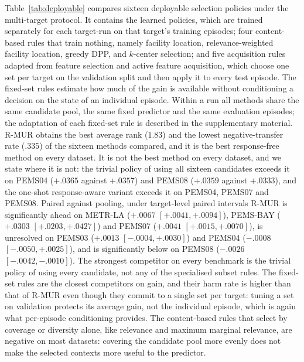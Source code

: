 Table~\ref{tab:deployable} compares sixteen deployable selection policies
under the multi-target protocol. It contains the learned policies, which are
trained separately for each target-run on that target's training episodes;
four content-based rules that train nothing, namely facility location,
relevance-weighted facility location, greedy DPP, and $k$-center selection; and
five acquisition rules adapted from feature selection and active feature
acquisition, which choose one set per target on the validation split and then
apply it to every test episode. The fixed-set rules estimate how much of the
gain is available without conditioning a decision on the state of an individual
episode. Within a run all methods share the same candidate pool, the same fixed
predictor and the same evaluation episodes; the adaptation of each fixed-set
rule is described in the supplementary material. R-MUR obtains the best average
rank ($1.83$) and the lowest negative-transfer rate ($.335$) of the sixteen
methods compared, and it is the best response-free method on every dataset. It
is not the best method on every dataset, and we state where it is not: the
trivial policy of using all sixteen candidates exceeds it on PEMS04 ($+.0365$
against $+.0357$) and PEMS08 ($+.0359$ against $+.0333$), and the one-shot
response-aware variant exceeds it on PEMS04, PEMS07 and PEMS08. Paired against
pooling, under target-level paired intervals R-MUR is significantly ahead on
METR-LA ($+.0067$ $[+.0041,+.0094]$), PEMS-BAY ($+.0303$ $[+.0203,+.0427]$) and
PEMS07 ($+.0041$ $[+.0015,+.0070]$), is unresolved on PEMS03 ($+.0013$
$[-.0004,+.0030]$) and PEMS04 ($-.0008$ $[-.0050,+.0025]$), and is
significantly below on PEMS08 ($-.0026$ $[-.0042,-.0010]$). The strongest competitor on every benchmark is the
trivial policy of using every candidate, not any of the specialised subset
rules. The fixed-set rules are
the closest competitors on gain, and their harm rate is higher than that of
R-MUR even though they commit to a single set per target: tuning a set on
validation protects its average gain, not the individual episode, which is
again what per-episode conditioning provides. The content-based
rules that select by coverage or diversity alone, like relevance and maximum
marginal relevance, are negative on most datasets: covering the candidate pool
more evenly does not make the selected contexts more useful to the predictor.

